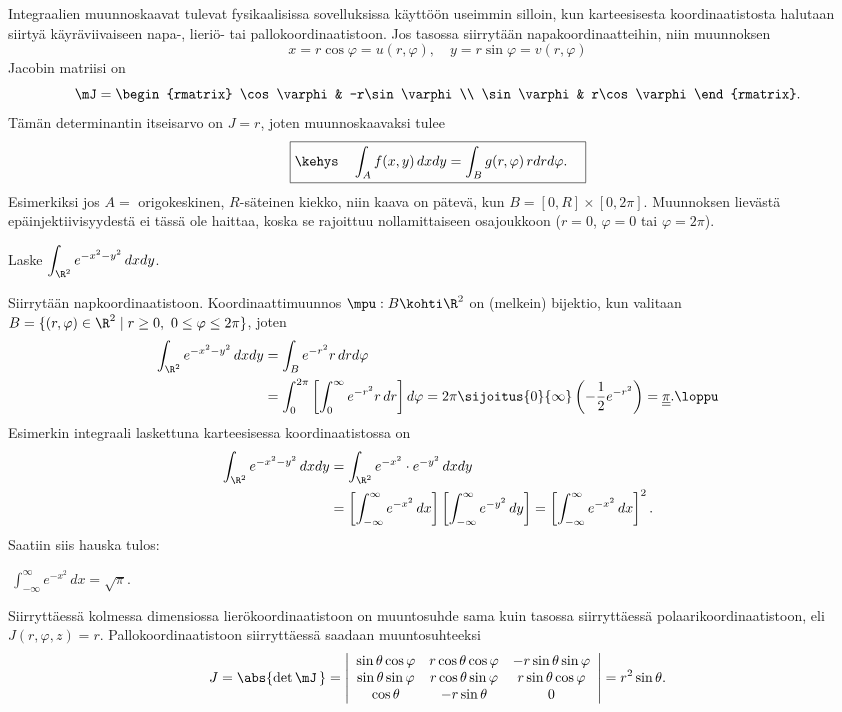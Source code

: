 Integraalien muunnoskaavat tulevat fysikaalisissa sovelluksissa käyttöön useimmin silloin, kun
karteesisesta koordinaatistosta halutaan siirtyä käyräviivaiseen napa-, lieriö- tai 
pallokoordinaatistoon. Jos tasossa siirrytään napakoordinaatteihin, niin muunnoksen
\[
x=r\cos\varphi=u(r,\varphi), \quad y=r\sin\varphi=v(r,\varphi)
\]
Jacobin matriisi on
\[
\mJ=\begin{rmatrix} \cos\varphi & -r\sin\varphi \\ \sin\varphi & r\cos\varphi \end{rmatrix}.
\]
Tämän determinantin itseisarvo on $J=r$, joten muunnoskaavaksi tulee
\[
\boxed{\kehys\quad \int_A f(x,y)\,dxdy=\int_B g(r,\varphi)\,rdrd\varphi. \quad}
\]
Esimerkiksi jos $A=$ origokeskinen, $R$-säteinen kiekko, niin kaava on pätevä, kun 
$B=[0,R]\times[0,2\pi]$. Muunnoksen lievästä epäinjektiivisyydestä ei tässä ole haittaa, koska
se rajoittuu nollamittaiseen osajoukkoon ($r=0$, $\varphi=0$ tai $\varphi=2\pi$).
\begin{Exa} Laske $\displaystyle{\int_{\R^2} e^{-x^2-y^2}\,dxdy}$.
\end{Exa}
\ratk Siirrytään napkoordinaatistoon. Koordinaattimuunnos $\mpu: B \kohti \R^2$ on (melkein)
bijektio, kun valitaan $B=\{(r,\varphi)\in\R^2 \mid r \ge 0,\ 0 \le \varphi \le 2\pi\}$, joten
\begin{align*}
\int_{\R^2} e^{-x^2-y^2}\,dxdy 
&= \int_B e^{-r^2}r\,dr d\varphi \\
&= \int_0^{2\pi} \left[\int_0^\infty e^{-r^2}r\,dr\right]d\varphi
 = 2\pi \sijoitus{0}{\infty} \left(-\frac{1}{2}e^{-r^2}\right)
 = \underline{\underline{\pi}}. \loppu
\end{align*}
Esimerkin integraali laskettuna karteesisessa koordinaatistossa on
\begin{align*}
\int_{\R^2} e^{-x^2-y^2}\,dxdy &= \int_{\R^2} e^{-x^2}\cdot e^{-y^2}\,dxdy \\
&= \left[\int_{-\infty}^\infty e^{-x^2}\,dx\right]
   \left[\int_{-\infty}^\infty e^{-y^2}\,dy\right] 
 = \left[\int_{-\infty}^\infty e^{-x^2}\,dx\right]^2.
\end{align*}
Saatiin siis hauska tulos:
\begin{Prop} \label{Gamma(1/2)} $\ \int_{-\infty}^\infty e^{-x^2}\,dx=\sqrt{\pi}$.
\end{Prop}
Siirryttäessä kolmessa dimensiossa lierökoordinaatistoon on muuntosuhde sama kuin tasossa
siirryttäessä polaarikoordinaatistoon, eli $J(r,\varphi,z)=r$. Pallokoordinaatistoon
siirryttäessä saadaan muuntosuhteeksi
\[ 
J=\abs{\det\mJ\,}=\left|\begin{array}{ccc} 
                  \sin\theta\cos\varphi & r\cos\theta\cos\varphi & -r\sin\theta\sin\varphi \\
                  \sin\theta\sin\varphi & r\cos\theta\sin\varphi & r\sin\theta\cos\varphi \\
                  \cos\theta            & -r\sin\theta           & 0
                  \end{array}\right| = r^2\sin\theta. 
\]
